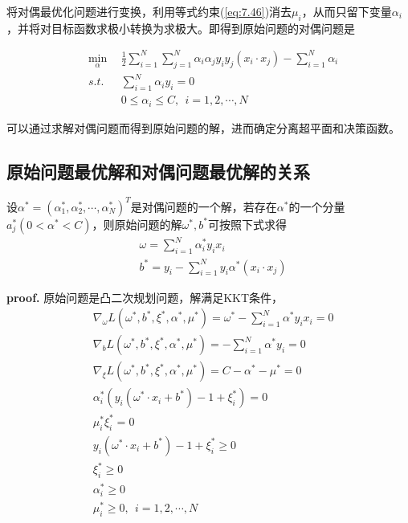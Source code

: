 将对偶最优化问题进行变换，利用等式约束(\ref{eq:7.46})消去$\mu_i$，从而只留下变量$\alpha_i$，并将对目标函数求极小转换为求极大。即得到原始问题的对偶问题是
\begin{framed}

\begin{eqnarray}
    & \min\limits_{\alpha} \ \ &\frac{1}{2}\sum\limits_{i=1}^{N}\sum\limits_{j=1}^{N}
    \alpha_i\alpha_jy_iy_j(x_i\cdot x_j)-\sum\limits_{i=1}^{N}\alpha_i\\
    & s.t. & \sum\limits_{i=1}^{N}\alpha_iy_i=0\\
    &      & 0\leqslant \alpha_i\leqslant C,\ \ i=1,2,\cdots,N
\end{eqnarray}
    
\end{framed}

可以通过求解对偶问题而得到原始问题的解，进而确定分离超平面和决策函数。

\subsection*{原始问题最优解和对偶问题最优解的关系}

\begin{theorem}
    设$\alpha^*=(\alpha^*_1,\alpha^*_2,\cdots,\alpha^*_N)^T$是对偶问题的一个解，若存在$\alpha^*$的一个分量
    $a^*_j(0 <\alpha^*<C)$，则原始问题的解$\omega^*,b^*$可按照下式求得
    \begin{eqnarray}
        & \omega=\sum\limits_{i=1}^{N}\alpha^*_iy_ix_i\\
        & b^* = y_i-\sum\limits_{i=1}^{N}y_i\alpha^*(x_i\cdot x_j)
    \end{eqnarray}
\end{theorem}
\textbf{proof. } 原始问题是凸二次规划问题，解满足KKT条件，
\begin{eqnarray}
    & \nabla_\omega L(\omega^*,b^*,\xi^*,\alpha^*,\mu^*)=\omega^*-\sum\limits_{i=1}^{N}\alpha^*y_ix_i=0\\
    & \nabla_b L(\omega^*,b^*,\xi^*,\alpha^*,\mu^*) = -\sum\limits_{i=1}^{N}\alpha^*y_i=0\\
    & \nabla_\xi L(\omega^*,b^*,\xi^*,\alpha^*,\mu^*) = C-\alpha^*-\mu^*=0\\
    & \alpha_i^*(y_i(\omega^*\cdot x_i+b^*)-1+\xi^*_i)=0\\
    & \mu^*_i\xi^*_i = 0\\
    & y_i(\omega^*\cdot x_i+b^*)-1+\xi^*_i\geqslant 0\\
    & \xi^*_i\geqslant 0\\
    & \alpha^*_i\geqslant 0\\
    & \mu^*_i\geqslant 0,\ \ i=1,2,\cdots,N
\end{eqnarray}

